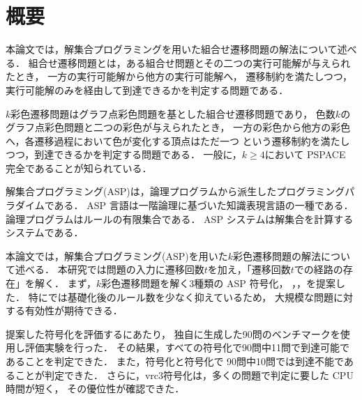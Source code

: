 \chapter*{概要}

本論文では，解集合プログラミングを用いた組合せ遷移問題の解法について述べる．
組合せ遷移問題とは，ある組合せ問題とその二つの実行可能解が与えられたとき，
一方の実行可能解から他方の実行可能解へ，
遷移制約を満たしつつ，実行可能解のみを経由して到達できるかを判定する問題である．

$k$彩色遷移問題はグラフ点彩色問題を基とした組合せ遷移問題であり，
色数$k$のグラフ点彩色問題と二つの彩色が与えられたとき，
一方の彩色から他方の彩色へ，各遷移過程において色が変化する頂点はただ一つ
という遷移制約を満たしつつ，到達できるかを判定する問題である．
一般に，$k \ge 4$において PSPACE 完全であることが知られている．

解集合プログラミング(ASP)は，論理プログラムから派生したプログラミングパラダイムである．
ASP 言語は一階論理に基づいた知識表現言語の一種である．
論理プログラムはルールの有限集合である．
ASP システムは解集合を計算するシステムである．

本論文では，解集合プログラミング(ASP)を用いた$k$彩色遷移問題の解法について述べる．
本研究では問題の入力に遷移回数$t$を加え，「遷移回数$t$での経路の存在」を解く．
まず，$k$彩色遷移問題を解く3種類の ASP 符号化，
，，を提案した．
特にでは基礎化後のルール数を少なく抑えているため，
大規模な問題に対する有効性が期待できる．

提案した符号化を評価するにあたり，
独自に生成した90問のベンチマークを使用し評価実験を行った．
その結果，すべての符号化で90問中11問で到達可能であることを判定できた．
また，符号化と符号化で
90問中10問では到達不能であることが判定できた．
さらに，\textsf{vrc3}符号化は，多くの問題で判定に要した CPU 時間が短く，
その優位性が確認できた．


